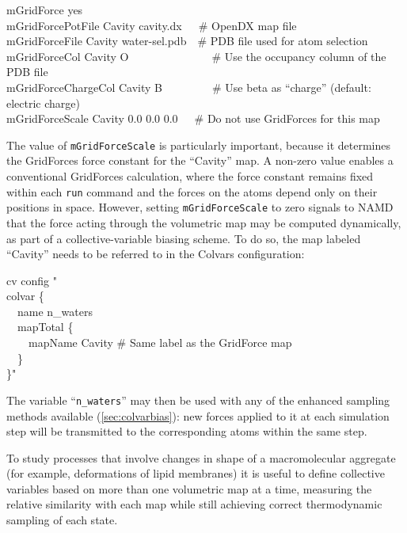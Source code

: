{{\begin{mdexampleinput}
  \-mGridForce yes\\
  \-mGridForcePotFile Cavity cavity.dx~~~\# OpenDX map file\\
  \-mGridForceFile Cavity water-sel.pdb~~\# PDB file used for atom selection\\
  \-mGridForceCol Cavity O~~~~~~~~~~~~~~~\# Use the occupancy column of the PDB file\\
  \-mGridForceChargeCol Cavity B~~~~~~~~~\# Use beta as ``charge'' (default: electric charge)\\
  \-mGridForceScale Cavity 0.0 0.0 0.0~~~\# Do not use GridForces for this map\\
\end{mdexampleinput}

The value of \texttt{mGridForceScale} is particularly important, because it determines the GridForces force constant for the ``Cavity'' map.
A non-zero value enables a conventional GridForces calculation, where the force constant remains fixed within each \texttt{run} command and the forces on the atoms depend only on their positions in space.
However, setting \texttt{mGridForceScale} to zero signals to NAMD that the force acting through the volumetric map may be computed dynamically, as part of a collective-variable biasing scheme.
To do so, the map labeled ``Cavity'' needs to be referred to in the Colvars configuration:\\

\begin{mdexampleinput}
  \-cv config "\\
  \-colvar \{\\
  \-\-~~name n\_waters\\
  \-\-~~mapTotal \{\\
  \-\-~~~~mapName Cavity  \# Same label as the GridForce map\\
  \-\-~~\}\\
  \-\}"
\end{mdexampleinput}


The variable ``\texttt{n\_waters}'' may then be used with any of the enhanced sampling methods available (\ref{sec:colvarbias}): new forces applied to it at each simulation step will be transmitted to the corresponding atoms within the same step.
} %



To study processes that involve changes in shape of a macromolecular aggregate (for example, deformations of lipid membranes) it is useful to define collective variables based on more than one volumetric map at a time, measuring the relative similarity with each map while still achieving correct thermodynamic sampling of each state.

}
